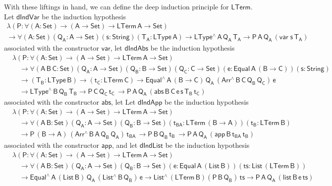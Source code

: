 \documentclass[9pt]{entcs}
\begin{document}
With these liftings in hand, we can define the deep induction
principle for $\mathsf{LTerm}$.
Let $\mathsf{dIndVar}$ be the induction hypothesis
\begin{multline*}
\mathsf{\lambda (P : \forall (A : Set) \to (A \to Set) \to LTerm\,A
  \to Set)} \\ \mathsf{\to 
  \forall (A : Set) (Q_A : A \to Set) (s : String) (T_A : LType\, A) 
  \to LType^{\wedge} \, A\, Q_A\, T_A
  \to P \, A\, Q_A\, (var \; s\, T_A)
  }
\end{multline*}
associated with the constructor $\mathsf{var}$,
let $\mathsf{dIndAbs}$ be the induction hypothesis
\begin{align*}
  &\mathsf{\lambda (P : \forall (A : Set) \to (A \to Set) \to LTerm\,A
    \to Set)} \\ 
  &\quad\mathsf{\to 
  \forall (A\,B\,C: Set) (Q_A : A \to Set)  (Q_B : B \to Set) (Q_C : C
  \to Set) (e : Equal\, A\, (B \to C)) (s : String) } \\ 
  &\quad\mathsf{ \to (T_B : LType\, B) \to (t_C : LTerm\, C)
  \to Equal^{\wedge}\,A\,(B \to C)\, Q_A \, (Arr^{\wedge} \, B\, C\,
  Q_B \, Q_C) \, e } \\
  &\quad\mathsf{
  \to LType^{\wedge}\, B\, Q_B\, T_B
  \to P\, C\, Q_C\, t_C\, 
  \to P \, A\, Q_A\, (abs \,B \,C \, e \,s \,T_B \, t_C)
  }
\end{align*}
associated with the constructor $\mathsf{abs}$, let
Let $\mathsf{dIndApp}$ be the induction hypothesis
\begin{align*}
  &\mathsf{\lambda (P : \forall (A : Set) \to (A \to Set) \to LTerm\,A
    \to Set)} \\ 
  &\quad \mathsf{\to 
  \forall (A \,B : Set) (Q_A : A \to Set)  (Q_B : B \to Set) 
   (t_{BA} : LTerm\, (B \to A)) (t_B : LTerm\, B)} \\
  &\quad \mathsf{
  \to P\, (B \to A)\, (Arr^{\wedge} \, B\, A\, Q_B \, Q_A) \, t_{BA} \, 
  \to P\, B\, Q_B\, t_B\, 
  \to P \, A\, Q_A\, (app \,B \,t_{BA} \, t_B) }
\end{align*}
associated with the constructor $\mathsf{app}$, and 
let $\mathsf{dIndList}$ be the induction hypothesis
\begin{align*}
  &\mathsf{\lambda (P : \forall (A : Set) \to (A \to Set) \to LTerm\,A
    \to Set)} \\ 
  &\quad \mathsf{\to 
  \forall (A \,B : Set) (Q_A : A \to Set)  (Q_B : B \to Set) 
    (e : Equal\, A\, (List\, B)) (ts : List\, (LTerm\, B))} \\ 
  &\quad \mathsf{
    \to Equal^{\wedge}\, A\, (List\,B)\, Q_A\, (List^{\wedge}\, B\, Q_B)\, e 
  \to List^{\wedge}\, (LTerm\,B) (P\, B\, Q_B)\, ts
  \to P \, A\, Q_A\, (list \,B \,e \, ts) }
\end{align*}
\end{document}
